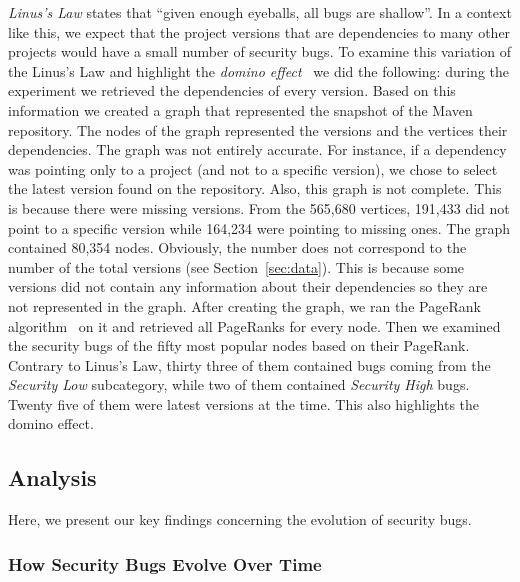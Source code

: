 \documentclass{sig-alternate}
\begin{document}
{\it Linus's Law} states that ``given enough eyeballs, all bugs are shallow''.
In a context like this, we expect that
the project versions that are dependencies to many other projects
would have a small number of security
bugs. To examine this variation of the Linus's Law and highlight the
{\it domino effect}~\cite{TH04} we did the
following: during the experiment we retrieved the
dependencies of every version. Based on this information we created a graph
that represented the snapshot of the Maven repository. The
nodes of the graph represented the versions and the vertices their dependencies.
The graph was not entirely accurate. For instance, if
a dependency was pointing only to a project (and not to a specific version), we chose to
select the latest version found on the repository. Also, this graph is not
complete. This is because there were missing versions.
From the 565,680 vertices, 191,433
did not point to a specific version while 164,234 were pointing to missing ones.
The graph contained 80,354 nodes. Obviously, the number does not correspond to
the number of the total versions (see Section~\ref{sec:data}). This is because
some versions did not contain any information about their dependencies so they
are not represented in the graph. After creating the graph, we ran the PageRank
algorithm~\cite{BP98} on it and retrieved all PageRanks for every node. Then we
examined the security bugs of the fifty most popular nodes based on their PageRank.
Contrary to Linus's Law, thirty three of them contained bugs coming from the
{\it Security Low} subcategory, while two of them contained {\it
  Security High} bugs.
Twenty five of them were latest versions at the time. This also highlights
the domino effect.

\subsection{Analysis}
\label{sec:analysis}

Here, we present our key findings concerning the evolution of security bugs.

\subsubsection{How Security Bugs Evolve Over Time}
\end{document}
